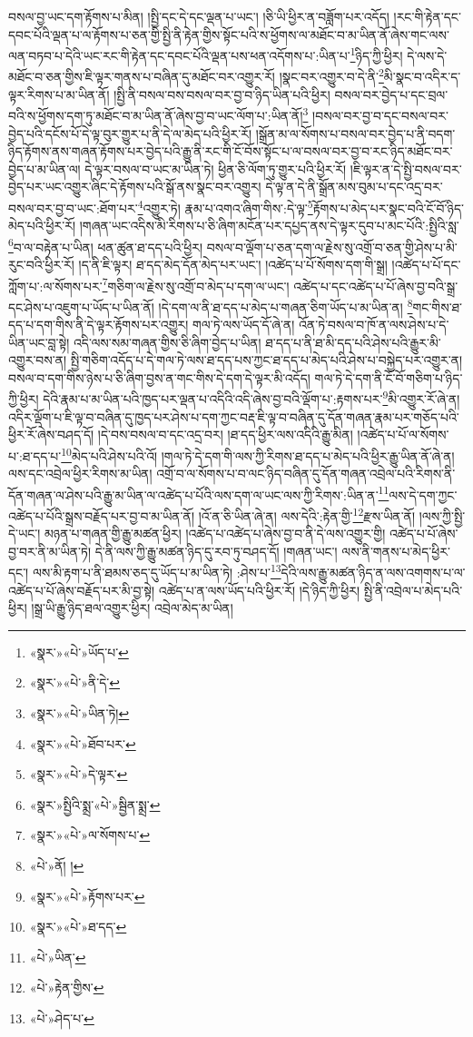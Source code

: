 བསལ་བྱ་ཡང་དག་རྟོགས་པ་མིན། །སྤྱི་དང་དེ་དང་ལྡན་པ་ཡང་། །ཅི་ཡི་ཕྱིར་ན་བཟློག་པར་འདོད། །རང་གི་རྟེན་དང་དབང་པོའི་ལྡན་པ་ལ་རྟོགས་པ་ཅན་གྱི་སྤྱི་ནི་རྟེན་གྱིས་སྟོང་པའི་ས་ཕྱོགས་ལ་མཐོང་བ་མ་ཡིན་ནོ་ཞེས་གང་ལས་ལན་བཏབ་པ་དེའི་ཡང་རང་གི་རྟེན་དང་དབང་པོའི་ལྡན་པས་ཕན་འདོགས་པ་:ཡིན་པ་\footnote{«སྣར་»«པེ་»ཡོད་པ་}ཉིད་ཀྱི་ཕྱིར། དེ་ལས་དེ་མཐོང་བ་ཅན་གྱིས་ཇི་ལྟར་གནས་པ་བཞིན་དུ་མཐོང་བར་འགྱུར་རོ། །སྣང་བར་འགྱུར་བ་དེ་ནི་\footnote{«སྣར་»«པེ་»ནི་དེ་}མི་སྣང་བ་འདིར་ད་ལྟར་རིགས་པ་མ་ཡིན་ནོ། །སྤྱི་ནི་བསལ་བས་བསལ་བར་བྱ་བ་ཉིད་ཡིན་པའི་ཕྱིར། བསལ་བར་བྱེད་པ་དང་བྲལ་བའི་ས་ཕྱོགས་དག་ཏུ་མཐོང་བ་མ་ཡིན་ནོ་ཞེས་བྱ་བ་ཡང་ལོག་པ་:ཡིན་ནོ།\footnote{«སྣར་»«པེ་»ཡིན་ཏེ།} །བསལ་བར་བྱ་བ་དང་བསལ་བར་བྱེད་པའི་དངོས་པོ་དེ་ལྟ་བུར་གྱུར་པ་ནི་དེ་ལ་མེད་པའི་ཕྱིར་རོ། །སྒྲོན་མ་ལ་སོགས་པ་བསལ་བར་བྱེད་པ་ནི་བདག་ཉིད་རྟོགས་ནས་གཞན་རྟོགས་པར་བྱེད་པའི་རྒྱུ་ནི་རང་གི་ངོ་བོས་སྟོང་པ་ལ་བསལ་བར་བྱ་བ་རང་ཉིད་མཐོང་བར་བྱེད་པ་མ་ཡིན་ལ། དེ་ལྟར་བསལ་བ་ཡང་མ་ཡིན་ཏེ། ཕྱིན་ཅི་ལོག་ཏུ་གྱུར་པའི་ཕྱིར་རོ། །ཇི་ལྟར་ན་དེ་སྤྱི་བསལ་བར་བྱེད་པར་ཡང་འགྱུར་ཞིང་དེ་རྟོགས་པའི་སྒོ་ནས་སྣང་བར་འགྱུར། དེ་ལྟ་ན་དེ་ནི་སྒྲོན་མས་བུམ་པ་དང་འདྲ་བར་བསལ་བར་བྱ་བ་ཡང་:ཐོག་པར་\footnote{«སྣར་»«པེ་»ཐོབ་པར་}འགྱུར་ཏེ། རྣམ་པ་འགའ་ཞིག་གིས་:དེ་ལྟ་\footnote{«སྣར་»«པེ་»དེ་ལྟར་}རྟོགས་པ་མེད་པར་སྣང་བའི་ངོ་བོ་ཉིད་མེད་པའི་ཕྱིར་རོ། །གཞན་ཡང་འདིས་མི་རིགས་པ་ཅི་ཞིག་མངོན་པར་དཔྱད་ནས་དེ་ལྟར་དུབ་པ་མང་པོའི་:སྤྱིའི་སླ་\footnote{«སྣར་»སྤྱིའི་སྨྲ་«པེ་»སྦྱིན་སྨྲ་}བ་ལ་བརྟེན་པ་ཡིན། ཕན་ཚུན་ཐ་དད་པའི་ཕྱིར། བསལ་བ་ལྡོག་པ་ཅན་དག་ལ་རྗེས་སུ་འགྲོ་བ་ཅན་གྱི་ཤེས་པ་མི་རུང་བའི་ཕྱིར་རོ། །ད་ནི་ཇི་ལྟར། ཐ་དད་མེད་དོན་མེད་པར་ཡང་། །འཚེད་པ་པོ་སོགས་དག་གི་སྒྲ། །འཚེད་པ་པོ་དང་ཀློག་པ་:ལ་སོགས་པར་\footnote{«སྣར་»«པེ་»ལ་སོགས་པ་}གཅིག་ལ་རྗེས་སུ་འགྲོ་བ་མེད་པ་དག་ལ་ཡང་། འཚེད་པ་དང་འཚེད་པ་པོ་ཞེས་བྱ་བའི་སྒྲ་དང་ཤེས་པ་འཇུག་པ་ཡོད་པ་ཡིན་ནོ། །དེ་དག་ལ་ནི་ཐ་དད་པ་མེད་པ་གཞན་ཅིག་ཡོད་པ་མ་ཡིན་ན། \footnote{«པེ་»ནོ། ། }གང་གིས་ཐ་དད་པ་དག་གིས་ནི་དེ་ལྟར་རྟོགས་པར་འགྱུར། གལ་ཏེ་ལས་ཡོད་དོ་ཞེ་ན། འོན་ཏེ་བསལ་བ་ཁོ་ན་ལས་ཤེས་པ་དེ་ཡིན་ཡང་བླ་སྟེ། འདི་ལས་སམ་གཞན་གྱིས་ཅི་ཞིག་བྱེད་པ་ཡིན། ཐ་དད་པ་ནི་ཐ་མི་དད་པའི་ཤེས་པའི་རྒྱུར་མི་འགྱུར་བས་ན། སྤྱི་གཅིག་འདོད་པ་དེ་གལ་ཏེ་ལས་ཐ་དད་པས་ཀྱང་ཐ་དད་པ་མེད་པའི་ཤེས་པ་བསྐྱེད་པར་འགྱུར་ན། བསལ་བ་དག་གིས་ཉེས་པ་ཅི་ཞིག་བྱས་ན་གང་གིས་དེ་དག་དེ་ལྟར་མི་འདོད། གལ་ཏེ་དེ་དག་ནི་ངོ་བོ་གཅིག་པ་ཉིད་ཀྱི་ཕྱིར། དེའི་རྣམ་པ་མ་ཡིན་པའི་ཁྱད་པར་ལྡན་པ་འདིའི་འདི་ཞེས་བྱ་བའི་ལྡོག་པ་:རྟགས་པར་\footnote{«སྣར་»«པེ་»རྟོགས་པར་}མི་འགྱུར་རོ་ཞེ་ན། འདིར་ལྡོག་པ་ཇི་ལྟ་བ་བཞིན་དུ་ཁྱད་པར་ཤེས་པ་དག་ཀྱང་བརྡ་ཇི་ལྟ་བ་བཞིན་དུ་དོན་གཞན་རྣམ་པར་གཅོད་པའི་ཕྱིར་རོ་ཞེས་བཤད་དོ། །དེ་བས་བསལ་བ་དང་འདྲ་བར། །ཐ་དད་ཕྱིར་ལས་འདིའི་རྒྱུ་མིན། །འཚེད་པ་པོ་ལ་སོགས་པ་:ཐ་དད་པ་\footnote{«སྣར་»«པེ་»ཐ་དད་}མེད་པའི་ཤེས་པའི་འོ། །གལ་ཏེ་དེ་དག་གི་ལས་ཀྱི་རིགས་ཐ་དད་པ་མེད་པའི་ཕྱིར་རྒྱུ་ཡིན་ནོ་ཞེ་ན། ལས་དང་འབྲེལ་ཕྱིར་རིགས་མ་ཡིན། འགྲོ་བ་ལ་སོགས་པ་བ་ལང་ཉིད་བཞིན་དུ་དོན་གཞན་འབྲེལ་པའི་རིགས་ནི་དོན་གཞན་ལ་ཤེས་པའི་རྒྱུ་མ་ཡིན་ལ་འཚེད་པ་པོའི་ལས་དག་ལ་ཡང་ལས་ཀྱི་རིགས་:ཡིན་ན་\footnote{«པེ་»ཡིན་}ལས་དེ་དག་ཀྱང་འཚེད་པ་པོའི་སྒྲས་བརྗོད་པར་བྱ་བ་མ་ཡིན་ནོ། །འོ་ན་ཅི་ཡིན་ཞེ་ན། ལས་དེའི་:རྟེན་གྱི་\footnote{«པེ་»རྟེན་གྱིས་}རྫས་ཡིན་ནོ། །ལས་ཀྱི་སྤྱི་དེ་ཡང་། མཉན་པ་གཞན་གྱི་རྒྱུ་མཚན་ཕྱིར། །འཚེད་པ་འཚེད་པ་ཞེས་བྱ་བ་ནི་དེ་ལས་འགྱུར་གྱི། འཚེད་པ་པོ་ཞེས་བྱ་བར་ནི་མ་ཡིན་ཏེ། དེ་ནི་ལས་ཀྱི་རྒྱུ་མཚན་ཉིད་དུ་རབ་ཏུ་བཤད་དོ། །གཞན་ཡང་། ལས་ནི་གནས་པ་མེད་ཕྱིར་དང་། ལས་མི་རྟག་པ་ནི་ཐམས་ཅད་དུ་ཡོད་པ་མ་ཡིན་ཏེ། :ཤེས་པ་\footnote{«པེ་»ཤེད་པ་}དེའི་ལས་རྒྱུ་མཚན་ཉིད་ན་ལས་འགགས་པ་ལ་འཚེད་པ་པོ་ཞེས་བརྗོད་པར་མི་བྱ་སྟེ། འཚེད་པ་ན་ལས་ཡོད་པའི་ཕྱིར་རོ། །དེ་ཉིད་ཀྱི་ཕྱིར། སྤྱི་ནི་འབྲེལ་པ་མེད་པའི་ཕྱིར། །སྒྲ་ཡི་རྒྱུ་ཉིད་ཐལ་འགྱུར་ཕྱིར། འབྲེལ་མེད་མ་ཡིན། 